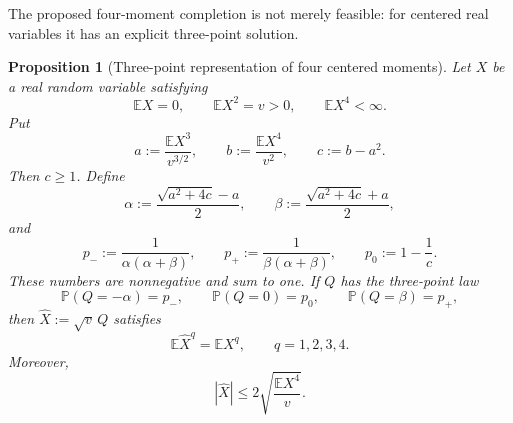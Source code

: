 \documentclass[10pt,a4paper]{amsart}
\newtheorem{proposition}[theorem]{Proposition}
\newcommand{\E}{\mathbb E}
\begin{document}
The proposed four-moment completion is not merely feasible: for centered real
variables it has an explicit three-point solution.

\begin{proposition}[Three-point representation of four centered moments]
\label{prop:three-point-package}
Let \(X\) be a real random variable satisfying
\begin{equation}\label{eq:X-moments-package}
 \E X=0,
 \qquad
 \E X^2=v>0,
 \qquad
 \E X^4<\infty.
\end{equation}
Put
\begin{equation}\label{eq:standard-moments-package}
 a:=\frac{\E X^3}{v^{3/2}},
 \qquad
 b:=\frac{\E X^4}{v^2},
 \qquad
 c:=b-a^2.
\end{equation}
Then \(c\ge1\).  Define
\begin{equation}\label{eq:alpha-beta-package}
 \alpha:=\frac{\sqrt{a^2+4c}-a}{2},
 \qquad
 \beta:=\frac{\sqrt{a^2+4c}+a}{2},
\end{equation}
and
\begin{equation}\label{eq:three-probs-package}
 p_-:=\frac{1}{\alpha(\alpha+\beta)},
 \qquad
 p_+:=\frac{1}{\beta(\alpha+\beta)},
 \qquad
 p_0:=1-\frac1c.
\end{equation}
These numbers are nonnegative and sum to one.  If \(Q\) has the three-point
law
\begin{equation}\label{eq:Q-law-package}
 \mathbb P(Q=-\alpha)=p_-,
 \qquad
 \mathbb P(Q=0)=p_0,
 \qquad
 \mathbb P(Q=\beta)=p_+,
\end{equation}
then \(\widehat X:=\sqrt v\,Q\) satisfies
\begin{equation}\label{eq:four-exact-package}
 \E\widehat X^q=\E X^q,
 \qquad q=1,2,3,4.
\end{equation}
Moreover,
\begin{equation}\label{eq:support-three-package}
 |\widehat X|
 \le2\sqrt{\frac{\E X^4}{v}}.
\end{equation}
\end{proposition}
\end{document}
